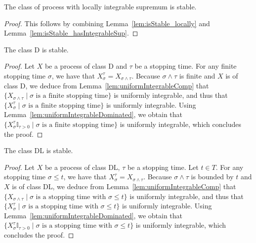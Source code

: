 \begin{lemma}\label{lem:isStable_hasLocallyIntegrableSup}
  \leanok
The class of process with locally integrable supremum is stable.
\end{lemma}

\begin{proof}\leanok
This follows by combining Lemma~\ref{lem:isStable_locally} and Lemma~\ref{lem:isStable_hasIntegrableSup}.
\end{proof}


\begin{lemma}\label{lem:isStable_classD}
  \leanok
The class D is stable.
\end{lemma}

\begin{proof}\leanok
Let $X$ be a process of class D and $\tau$ be a stopping time. For any finite stopping time $\sigma$, we have that $X_\sigma^\tau = X_{\sigma \land \tau}$. Because $\sigma \land \tau$ is finite and $X$ is of class D, we deduce from Lemma~\ref{lem:uniformIntegrableComp} that $\{X_{\sigma \land \tau} \mid \sigma \text{ is a finite stopping time}\}$ is uniformly integrable, and thus that $\{X^\tau_\sigma \mid \sigma \text{ is a finite stopping time}\}$ is uniformly integrable. Using Lemma~\ref{lem:uniformIntegrableDominated}, we obtain that $\{X^\tau_\sigma \mathbb{I}_{\tau > 0} \mid \sigma \text{ is a finite stopping time}\}$ is uniformly integrable, which concludes the proof.
\end{proof}


\begin{lemma}\label{lem:isStable_classDL}
  \leanok
  \leanok
The class DL is stable.
\end{lemma}

\begin{proof}
Let $X$ be a process of class DL, $\tau$ be a stopping time. Let $t \in T$. For any stopping time $\sigma \le t$, we have that $X_\sigma^\tau = X_{\sigma \land \tau}$. Because $\sigma \land \tau$ is bounded by $t$ and $X$ is of class DL, we deduce from Lemma~\ref{lem:uniformIntegrableComp} that $\{X_{\sigma \land \tau} \mid \sigma \text{ is a stopping time with } \sigma \le t\}$ is uniformly integrable, and thus that $\{X^\tau_\sigma \mid \sigma \text{ is a stopping time with } \sigma \le t\}$ is uniformly integrable. Using Lemma~\ref{lem:uniformIntegrableDominated}, we obtain that $\{X^\tau_\sigma \mathbb{I}_{\tau > 0} \mid \sigma \text{ is a stopping time with } \sigma \le t\}$ is uniformly integrable, which concludes the proof.
\end{proof}


